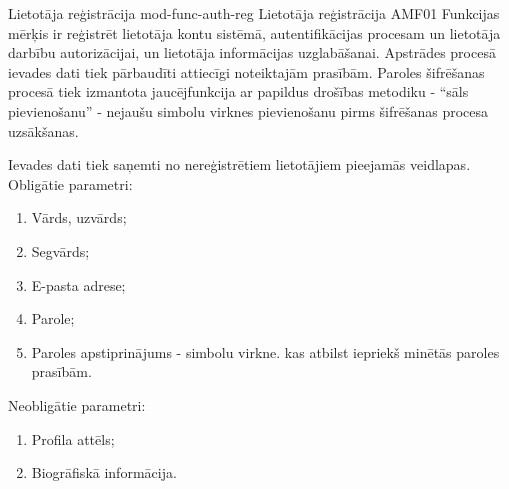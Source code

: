 \moduleFunctionTable
{Lietotāja reģistrācija}
{mod-func-auth-reg}
{Lietotāja reģistrācija}
{AMF01}
{
	Funkcijas mērķis ir reģistrēt lietotāja kontu sistēmā, autentifikācijas
	procesam un lietotāja darbību autorizācijai, un lietotāja informācijas
	uzglabāšanai. Apstrādes procesā ievades dati tiek pārbaudīti attiecīgi
	noteiktajām prasībām. Paroles šifrēšanas procesā tiek izmantota
	jaucējfunkcija ar papildus drošības metodiku - ``sāls pievienošanu'' -
	nejaušu simbolu virknes pievienošanu pirms šifrēšanas procesa uzsākšanas.
}
{
	Ievades dati tiek saņemti no nereģistrētiem lietotājiem pieejamās veidlapas. \\

	Obligātie parametri:
	\begin{enumerate}
		\item Vārds, uzvārds;
		\item Segvārds;
		\item E-pasta adrese;
		\item Parole;
		\item Paroles apstiprinājums - simbolu virkne. kas atbilst iepriekš minētās paroles prasībām.
	\end{enumerate}

	Neobligātie parametri:
	\begin{enumerate}
		\item Profila attēls;
		\item Biogrāfiskā informācija.
	\end{enumerate}
}
